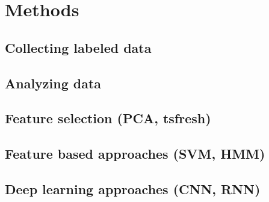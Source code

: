 \section{Methods}
\subsection{Collecting labeled data}
\subsection{Analyzing data}
\subsection{Feature selection (PCA, tsfresh)}
\subsection{Feature based approaches (SVM, HMM)}
\subsection{Deep learning approaches (CNN, RNN)}
